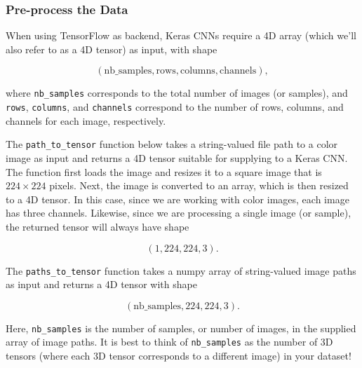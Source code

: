 \documentclass[11pt]{article}
\begin{document}
    \subsubsection{Pre-process the Data}\label{pre-process-the-data}

When using TensorFlow as backend, Keras CNNs require a 4D array (which
we'll also refer to as a 4D tensor) as input, with shape

\[
(\text{nb_samples}, \text{rows}, \text{columns}, \text{channels}),
\]

where \texttt{nb\_samples} corresponds to the total number of images (or
samples), and \texttt{rows}, \texttt{columns}, and \texttt{channels}
correspond to the number of rows, columns, and channels for each image,
respectively.

The \texttt{path\_to\_tensor} function below takes a string-valued file
path to a color image as input and returns a 4D tensor suitable for
supplying to a Keras CNN. The function first loads the image and resizes
it to a square image that is \(224 \times 224\) pixels. Next, the image
is converted to an array, which is then resized to a 4D tensor. In this
case, since we are working with color images, each image has three
channels. Likewise, since we are processing a single image (or sample),
the returned tensor will always have shape

\[
(1, 224, 224, 3).
\]

The \texttt{paths\_to\_tensor} function takes a numpy array of
string-valued image paths as input and returns a 4D tensor with shape

\[
(\text{nb_samples}, 224, 224, 3).
\]

Here, \texttt{nb\_samples} is the number of samples, or number of
images, in the supplied array of image paths. It is best to think of
\texttt{nb\_samples} as the number of 3D tensors (where each 3D tensor
corresponds to a different image) in your dataset!
\end{document}
